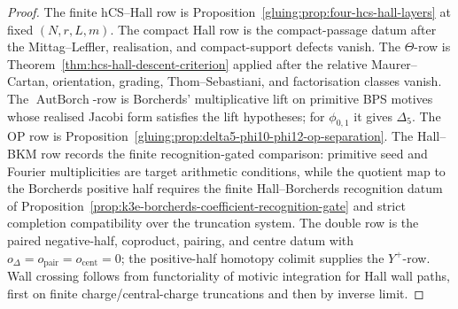 \begin{proof}
The finite hCS--Hall row is Proposition~\ref{gluing:prop:four-hcs-hall-layers}
at fixed \((N,r,L,m)\). The compact Hall row is the compact-passage
datum after the Mittag--Leffler, realisation, and compact-support
defects vanish. The
\(\Theta\)-row is Theorem~\ref{thm:hcs-hall-descent-criterion} applied
after the relative Maurer--Cartan, orientation, grading,
Thom--Sebastiani, and factorisation classes vanish. The
\(\operatorname{AutBorch}\)-row is Borcherds' multiplicative lift on
primitive BPS motives whose realised Jacobi form satisfies the lift
hypotheses; for \(\phi_{0,1}\) it gives \(\Delta_5\). The OP row is
Proposition~\ref{gluing:prop:delta5-phi10-phi12-op-separation}. The
Hall--BKM row records the finite recognition-gated comparison:
primitive seed and Fourier multiplicities are target arithmetic conditions,
while the quotient map to the Borcherds positive half requires the
finite Hall--Borcherds recognition datum of
Proposition~\ref{prop:k3e-borcherds-coefficient-recognition-gate} and
strict completion compatibility over the truncation system. The double
row is the paired negative-half, coproduct, pairing, and centre datum with
$o_\Delta=o_{\mathrm{pair}}=o_{\mathrm{cent}}=0$; the positive-half
homotopy colimit supplies the \(Y^+\)-row. Wall crossing follows from
functoriality of motivic integration for Hall wall paths, first on
finite charge/central-charge truncations and then by inverse limit.
\end{proof}
